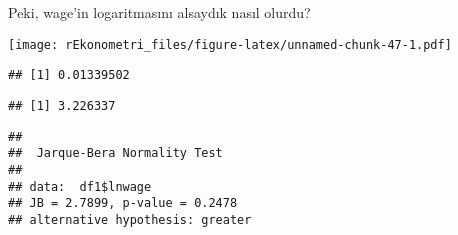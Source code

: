 \documentclass[
]{book}
\newenvironment{Shaded}{\begin{snugshade}}{\end{snugshade}}
\newcommand{\DataTypeTok}[1]{\textcolor[rgb]{0.13,0.29,0.53}{#1}}
\newcommand{\KeywordTok}[1]{\textcolor[rgb]{0.13,0.29,0.53}{\textbf{#1}}}
\newcommand{\NormalTok}[1]{#1}
\newcommand{\OperatorTok}[1]{\textcolor[rgb]{0.81,0.36,0.00}{\textbf{#1}}}
\newcommand{\StringTok}[1]{\textcolor[rgb]{0.31,0.60,0.02}{#1}}
\begin{document}
Peki, wage'in logaritmasını alsaydık nasıl olurdu?

\begin{Shaded}
\end{Shaded}

\texttt{[image: rEkonometri\_files/figure-latex/unnamed-chunk-47-1.pdf]}

\begin{Shaded}
\end{Shaded}

\begin{verbatim}
## [1] 0.01339502
\end{verbatim}

\begin{Shaded}
\end{Shaded}

\begin{verbatim}
## [1] 3.226337
\end{verbatim}

\begin{Shaded}
\end{Shaded}

\begin{verbatim}
## 
##  Jarque-Bera Normality Test
## 
## data:  df1$lnwage
## JB = 2.7899, p-value = 0.2478
## alternative hypothesis: greater
\end{verbatim}
\end{document}
